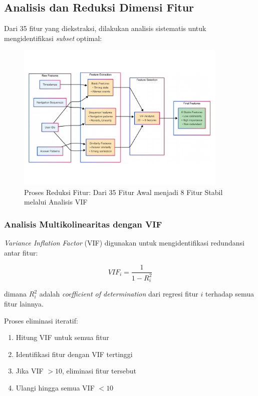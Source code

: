 \subsection{Analisis dan Reduksi Dimensi Fitur}
\label{sec:analisisReduksiFitur}

Dari 35 fitur yang diekstraksi, dilakukan analisis sistematis untuk mengidentifikasi \textit{subset} optimal:

\begin{figure}[htbp]
    \centering
    \includegraphics[width=0.9\textwidth]{figures/feature_engineering_process.pdf}
    \caption{Proses Reduksi Fitur: Dari 35 Fitur Awal menjadi 8 Fitur Stabil melalui Analisis VIF}
    \label{fig:feature_reduction_process}
\end{figure}

\subsubsection{Analisis Multikolinearitas dengan VIF}
\label{sec:analisisVIF}

\textit{Variance Inflation Factor} (VIF) digunakan untuk mengidentifikasi redundansi antar fitur:

\begin{equation}
VIF_i = \frac{1}{1-R_i^2}
\end{equation}

dimana $R_i^2$ adalah \textit{coefficient of determination} dari regresi fitur $i$ terhadap semua fitur lainnya.

Proses eliminasi iteratif:
\begin{enumerate}
    \item Hitung VIF untuk semua fitur
    \item Identifikasi fitur dengan VIF tertinggi
    \item Jika VIF $> 10$, eliminasi fitur tersebut
    \item Ulangi hingga semua VIF $< 10$
\end{enumerate}

